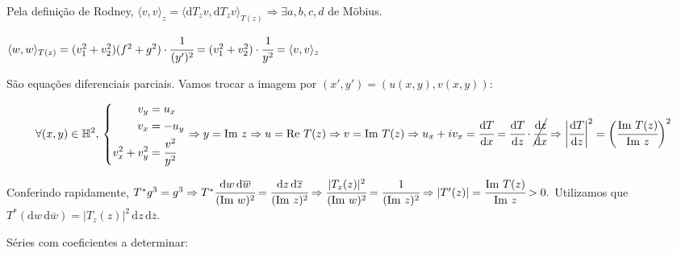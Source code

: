 \documentclass[10pt,a4paper]{article}
\date{}
\begin{document}
 \begin{flushright}
 \end{flushright}

		Pela defini\c{c}\~ao de Rodney, $\langle v, v \rangle_z = \langle \mathrm{d}T_z v, \mathrm{d}T_z v \rangle_{T(z)} \Rightarrow \exists a, b, c, d$ de M\"obius.

		$\langle w, w \rangle_{T(z)} = (v_1^2 + v_2^2)(f^2 + g^2) \cdot \cfrac{1}{(y')^2} = (v_1^2 + v_2^2) \cdot \cfrac{1}{y^2} = \langle v, v \rangle_z$

		S\~ao equa\c{c}\~oes diferenciais parciais. Vamos trocar a imagem por $(x',y') = (u(x,y), v(x,y))$:

		\begin{equation*}
			\forall (x,y) \in \mathbb{H}^2, \, \left\{\begin{aligned}
			    v_y &= u_x \\
			    v_x &= - u_y \\
			    v_x^2 + v_y^2 &= \cfrac{v^2}{y^2}
			\end{aligned}
			\right. \Rightarrow y = \text{Im } z \Rightarrow u = \text{Re } T(z) \Rightarrow v = \text{Im } T(z) \Rightarrow u_x + i v_x = \cfrac{\mathrm{d}T}{\mathrm{d}x} = \cfrac{\mathrm{d}T}{\mathrm{d}z} \cdot \cancel{\cfrac{\mathrm{d}z}{\mathrm{d}x}} \Rightarrow \bigg\vert \cfrac{\mathrm{d}T}{\mathrm{d}z} \bigg\vert^2 = \bigg( \cfrac{\text{Im } T(z)}{\text{Im } z} \bigg)^2
		\end{equation*}

		Conferindo rapidamente, $T^* g^3 = g^3 \Rightarrow T^* \cfrac{\mathrm{d}w \, \mathrm{d}\overline{w}}{(\text{Im } w)^2} = \cfrac{\mathrm{d}z \, \mathrm{d}\overline{z}}{(\text{Im } z)^2} \Rightarrow \cfrac{\vert T_z(z) \vert^2}{(\text{Im } w)^2} = \cfrac{1}{(\text{Im } z)^2} \Rightarrow \vert T'(z) \vert = \cfrac{\text{Im } T(z)}{\text{Im } z} > 0. $ Utilizamos que $T^* (\mathrm{d}w \, \mathrm{d}\overline{w}) = \vert T_z(z) \vert^2\, \mathrm{d}z \, \mathrm{d}\overline{z}$.

 S\'eries com coeficientes a determinar:
\end{document}

